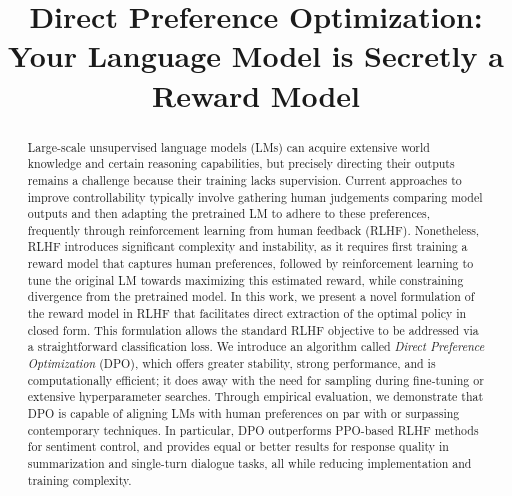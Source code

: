 \title{Direct Preference Optimization: Your Language Model is Secretly a Reward Model}

\begin{abstract}
Large-scale unsupervised language models (LMs) can acquire extensive world knowledge and certain reasoning capabilities, but precisely directing their outputs remains a challenge because their training lacks supervision. Current approaches to improve controllability typically involve gathering human judgements comparing model outputs and then adapting the pretrained LM to adhere to these preferences, frequently through reinforcement learning from human feedback (RLHF). Nonetheless, RLHF introduces significant complexity and instability, as it requires first training a reward model that captures human preferences, followed by reinforcement learning to tune the original LM towards maximizing this estimated reward, while constraining divergence from the pretrained model. In this work, we present a novel formulation of the reward model in RLHF that facilitates direct extraction of the optimal policy in closed form. This formulation allows the standard RLHF objective to be addressed via a straightforward classification loss. We introduce an algorithm called \textit{Direct Preference Optimization} (DPO), which offers greater stability, strong performance, and is computationally efficient; it does away with the need for sampling during fine-tuning or extensive hyperparameter searches. Through empirical evaluation, we demonstrate that DPO is capable of aligning LMs with human preferences on par with or surpassing contemporary techniques. In particular, DPO outperforms PPO-based RLHF methods for sentiment control, and provides equal or better results for response quality in summarization and single-turn dialogue tasks, all while reducing implementation and training complexity.
\end{abstract}

